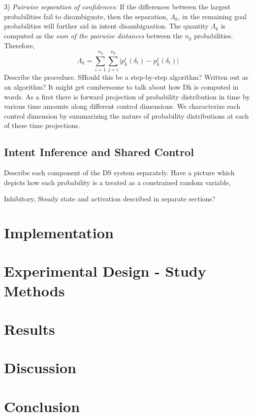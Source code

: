 3) \textit{Pairwise separation of confidences:} If the differences between the largest probabilities fail to disambiguate, then the separation, $\Lambda_k$, in the remaining goal probabilities will further aid in intent disambiguation. The quantity $\Lambda_k$ is computed as the \textit{sum of the pairwise distances} between the $n_g$ probabilities. Therefore, 
\begin{equation*}
\Lambda_k = \sum_{i=1}^{n_g}\sum_{j=i}^{n_g}\lvert p^i_k(\delta_t) - p^j_k(\delta_t)\rvert
\end{equation*}
Describe the procedure. SHould this be a step-by-step algorithm? Written out as an algorithm? 
It might get cumbersome to talk about how Dk is computed in words. As a first there is forward projection of probability distribution in time by various time amounts along different control dimensions. We characterize each control dimension by summarizing the nature of probability distributions at each of these time projections. 
\subsection{Intent Inference and Shared Control}\label{subsec:inference}

Describe each component of the DS system separately. Have a picture which depicts how each probability is a treated as a constrained random variable, 

Inhibitory, Steady state and activation described in separate sections?

\section{Implementation}\label{sec:implementation}

\section{Experimental Design - Study Methods}\label{sec:ed}
\section{Results}\label{sec:results}
\section{Discussion}\label{sec:discussions}
\section{Conclusion}\label{sec:conclusions}


